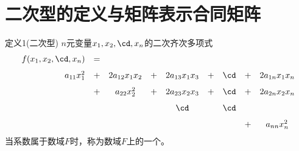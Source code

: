 \section{二次型的定义与矩阵表示\quad 合同矩阵}

\begin{frame}
  \begin{footnotesize}
    \begin{block}{定义1(二次型)}
      $n$元变量$x_1,x_2,\cd,x_n$的二次齐次多项式
      $$
      \begin{array}{rcccccccc}
        f(x_1,x_2,\cd,x_n) &=& \\[0.1in]
        a_{11}x_1^2&+&2a_{12}x_1x_2&+&2a_{13}x_1x_3&+&\cd&+&2a_{1n}x_1x_n\\[0.1in]
        &+&a_{22}x_2^2&+&2a_{23}x_2x_3&+&\cd&+&2a_{2n}x_2x_n\\[0.1in]
        &&&&\cd&&\cd\\[0.1in]
        &&&&&&&+&a_{nn}x_n^2
      \end{array}
      $$
     当系数属于数域$F$时，称为数域$F$上的一个。
    \end{block}
  \end{footnotesize}
\end{frame}


